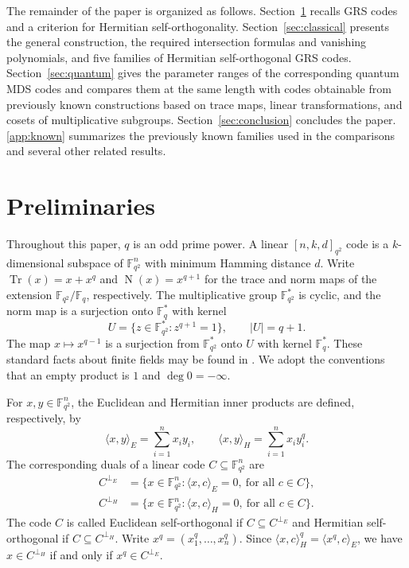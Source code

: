 \documentclass[preprint,12pt,a4paper]{elsarticle}
\newcommand{\Tr}{\operatorname{Tr}}
\newcommand{\N}{\operatorname{N}}
\begin{document}
The remainder of the paper is organized as follows. Section~\ref{sec:preliminaries} recalls GRS codes and a criterion for Hermitian self-orthogonality. Section~\ref{sec:classical} presents the general construction, the required intersection formulas and vanishing polynomials, and five families of Hermitian self-orthogonal GRS codes. Section~\ref{sec:quantum} gives the parameter ranges of the corresponding quantum MDS codes and compares them at the same length with codes obtainable from previously known constructions based on trace maps, linear transformations, and cosets of multiplicative subgroups. Section~\ref{sec:conclusion} concludes the paper. \ref{app:known} summarizes the previously known families used in the comparisons and several other related results.

\section{Preliminaries}\label{sec:preliminaries}

Throughout this paper, $q$ is an odd prime power. A linear $[n,k,d]_{q^2}$ code is a $k$-dimensional subspace of $\mathbb F_{q^2}^{n}$ with minimum Hamming distance $d$. Write $\Tr(x)=x+x^q$ and $\N(x)=x^{q+1}$ for the trace and norm maps of the extension $\mathbb F_{q^2}/\mathbb F_q$, respectively. The multiplicative group $\mathbb F_{q^2}^{*}$ is cyclic, and the norm map is a surjection onto $\mathbb F_q^{*}$ with kernel
\[
 U=\{z\in\mathbb F_{q^2}^{*}:z^{q+1}=1\},\qquad |U|=q+1.
\]
The map $x\mapsto x^{q-1}$ is a surjection from $\mathbb F_{q^2}^{*}$ onto $U$ with kernel $\mathbb F_q^{*}$. These standard facts about finite fields may be found in \cite[Chapter~2]{LidlNiederreiter1997}. We adopt the conventions that an empty product is $1$ and $\deg 0=-\infty$.


For $x,y\in\mathbb F_{q^2}^{n}$, the Euclidean and Hermitian inner products are defined, respectively, by
\[
 \langle x,y\rangle_E=\sum_{i=1}^{n}x_i y_i,
 \qquad
 \langle x,y\rangle_H=\sum_{i=1}^{n}x_i y_i^q.
\]
The corresponding duals of a linear code $C\subseteq\mathbb F_{q^2}^{n}$ are
\[
\begin{aligned}
 C^{\perp_E}&=\{x\in\mathbb F_{q^2}^{n}:\langle x,c\rangle_E=0,
                    \ \text{for all }c\in C\},\\
 C^{\perp_H}&=\{x\in\mathbb F_{q^2}^{n}:\langle x,c\rangle_H=0,
                    \ \text{for all }c\in C\}.
\end{aligned}
\]
The code $C$ is called Euclidean self-orthogonal if $C\subseteq C^{\perp_E}$ and Hermitian self-orthogonal if $C\subseteq C^{\perp_H}$. Write $x^q=(x_1^q,\ldots,x_n^q)$. Since $\langle x,c\rangle_H^q=\langle x^q,c\rangle_E$, we have $x\in C^{\perp_H}$ if and only if $x^q\in C^{\perp_E}$.
\end{document}
